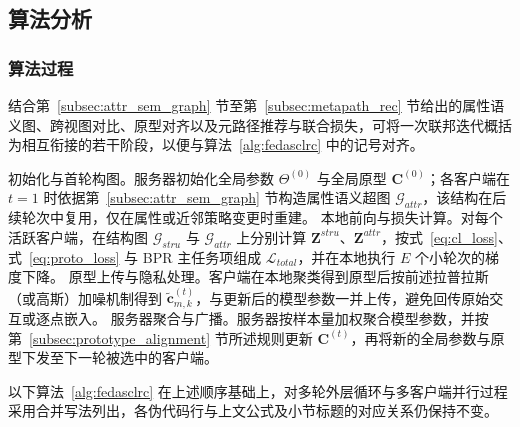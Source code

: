 \subsection{算法分析}
\label{sec:algorithm_analysis}

\subsubsection{算法过程}
\label{subsec:algorithm_process}
结合第~\ref{subsec:attr_sem_graph} 节至第~\ref{subsec:metapath_rec} 节给出的属性语义图、跨视图对比、原型对齐以及元路径推荐与联合损失，可将一次联邦迭代概括为相互衔接的若干阶段，以便与算法~\ref{alg:fedasclrc} 中的记号对齐。
\begin{cnenumerate}
    \cnitem 初始化与首轮构图。服务器初始化全局参数 $\Theta^{(0)}$ 与全局原型 $\mathbf{C}^{(0)}$；各客户端在 $t=1$ 时依据第~\ref{subsec:attr_sem_graph} 节构造属性语义超图 $\mathcal{G}_{attr}$，该结构在后续轮次中复用，仅在属性或近邻策略变更时重建。
    \cnitem 本地前向与损失计算。对每个活跃客户端，在结构图 $\mathcal{G}_{stru}$ 与 $\mathcal{G}_{attr}$ 上分别计算 $\mathbf{Z}^{stru}$、$\mathbf{Z}^{attr}$，按式~\eqref{eq:cl_loss}、式~\eqref{eq:proto_loss} 与 BPR 主任务项组成 $\mathcal{L}_{total}$，并在本地执行 $E$ 个小轮次的梯度下降。
    \cnitem 原型上传与隐私处理。客户端在本地聚类得到原型后按前述拉普拉斯（或高斯）加噪机制得到 $\tilde{\mathbf{c}}_{m,k}^{(t)}$，与更新后的模型参数一并上传，避免回传原始交互或逐点嵌入。
    \cnitem 服务器聚合与广播。服务器按样本量加权聚合模型参数，并按第~\ref{subsec:prototype_alignment} 节所述规则更新 $\mathbf{C}^{(t)}$，再将新的全局参数与原型下发至下一轮被选中的客户端。
\end{cnenumerate}
以下算法~\ref{alg:fedasclrc} 在上述顺序基础上，对多轮外层循环与多客户端并行过程采用合并写法列出，各伪代码行与上文公式及小节标题的对应关系仍保持不变。

